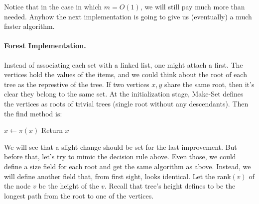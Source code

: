 Notice that in the case in which $m = O\left( 1 \right)$, we will still pay much more than needed. Anyhow the next implementation is going to give us (eventually) a much faster algorithm.

%


\paragraph{Forest Implementation.} Instead of associating each set with a linked list, one might attach a first. The vertices hold the values of the items, and we could think about the root of each tree as the represtive of the tree. If two vertices $x,y$ share the same root, then it's clear they belong to the same set. At the initialization stage, Make-Set defines the vertices as roots of trivial trees (single root without any descendants). Then the find method is: 

  \begin{algorithm}[H]
     { 
      $ x \leftarrow \pi\left( x \right)$
    }
    Return $x$ 
  \end{algorithm}    


We will see that a slight change should be set for the last improvement. But before that, let's try to mimic the decision rule above. Even those, we could define a size field for each root and get the same algorithm as above. Instead, we will define another field that, from first sight, looks identical. Let the rank$\left( v \right)$ of the node $v$ be the height of the $v$. Recall that tree's height defines to be the longest path from the root to one of the vertices. 


